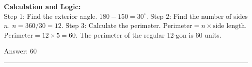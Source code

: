 \documentclass[11pt,paper=a4,answers]{exam}
\begin{document}
\begin{questions}
\begin{solution}
\vspace{30pt}

\textbf{Calculation and Logic:} \\
Step 1: Find the exterior angle. $180 - 150 = 30^\circ$. Step 2: Find the number of sides $n$. $n = 360 / 30 = 12$. Step 3: Calculate the perimeter. $\text{Perimeter} = n \times \text{side length}$. $\text{Perimeter} = 12 \times 5 = 60$. The perimeter of the regular 12-gon is 60 units.

\vspace{30pt}

Answer: \colorbox{yellow!100}{60}
\end{solution}



\end{questions}
\begin{center}
\rule{.5\textwidth}{1pt}
\end{center}
\end{document}
